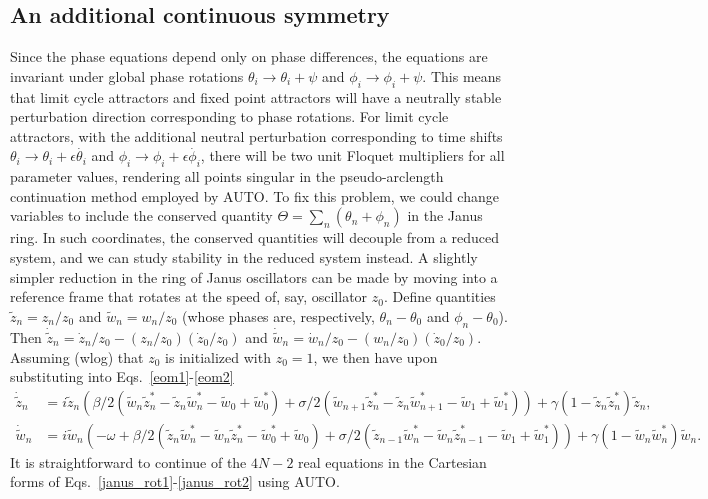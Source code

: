 \documentclass[aps,pre,amsmath,amssymb,floatfix,onecolumn,notitlepage,10pt]{revtex4-1}
\begin{document}
\subsection{An additional continuous symmetry}
Since the phase equations depend only on phase differences, the equations are invariant under global phase rotations $\theta_i\to\theta_i+\psi$ and $\phi_i\to \phi_i+\psi$.  This means that limit cycle attractors and fixed point attractors will have a neutrally stable perturbation direction corresponding to phase rotations. For limit cycle attractors, with the additional neutral perturbation corresponding to time shifts $\theta_i\to\theta_i+\epsilon\dot{\theta_i}$ and $\phi_i\to\phi_i+\epsilon\dot{\phi_i}$, there will be two unit Floquet multipliers for all parameter values, rendering all points singular in the pseudo-arclength continuation method employed by AUTO. To fix this problem, we could change variables to include the conserved quantity $\Theta = \sum_n \left(\theta_n + \phi_n\right)$ in the Janus ring. In such coordinates, the conserved quantities will decouple from a reduced system, and we can study stability in the reduced system instead.  A slightly simpler reduction in the ring of Janus oscillators can be made by moving into a reference frame that rotates at the speed of, say, oscillator $z_0$. Define quantities $\tilde{z}_n = z_n/z_0$ and $\tilde{w}_n = w_n/z_0$ (whose phases are, respectively, $\theta_n-\theta_0$ and $\phi_n-\theta_0$).  Then $\dot {\tilde z}_n = \dot z_n / z_0 - \left(z_n/z_0\right)\left( \dot z_0/z_0\right)$ and $\dot {\tilde w}_n = \dot w_n / z_0 - \left(w_n/z_0\right) \left(\dot z_0/z_0\right)$. Assuming (wlog) that $z_0$ is initialized with $z_0=1$, we then have upon substituting into Eqs.~\ref{eom1}-\ref{eom2}
\begin{align}
\dot {\tilde z}_n &= i{\tilde z}_n\left(  \beta/2\left({\tilde w}_n{\tilde z}_n^*-{\tilde z}_n{\tilde w}_n^* - {\tilde w}_0+{\tilde w}_0^*\right) + \sigma/2\left({\tilde w}_{n+1}{\tilde z}_n^*-{\tilde z}_n{\tilde w}_{n+1}^* - {\tilde w}_1+{\tilde w}_1^*\right)\right) + \gamma\left(1-{\tilde z}_n{\tilde z}_n^*\right){\tilde z}_n, \label{janus_rot1}\\
\dot {\tilde w}_n &= i{\tilde w}_n\left( -\omega + \beta/2\left({\tilde z}_n{\tilde w}_n^*-{\tilde w}_n{\tilde z}_n^* -{\tilde w}_0^*+{\tilde w}_0 \right) + \sigma/2\left({\tilde z}_{n-1}{\tilde w}_n^*-{\tilde w}_n{\tilde z}_{n-1}^* - {\tilde w}_1+{\tilde w}_1^*\right)\right) + \gamma\left(1-{\tilde w}_n{\tilde w}_n^*\right){\tilde w}_n. \label{janus_rot2}
\end{align}
It is straightforward to continue of the $4N-2$ real equations in the Cartesian forms of Eqs.~\eqref{janus_rot1}-\eqref{janus_rot2} using AUTO.
\end{document}
